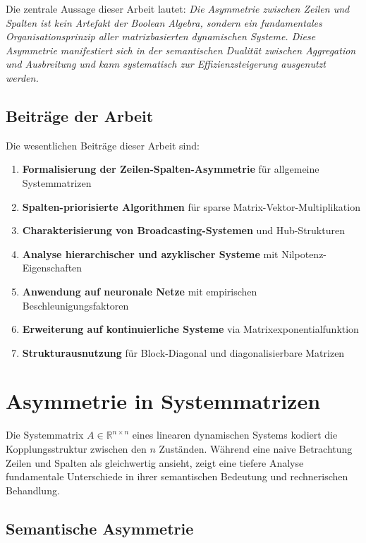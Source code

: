 ﻿\documentclass[a4paper,12pt]{report}
\theoremstyle{definition}
\begin{document}
	Die zentrale Aussage dieser Arbeit lautet: \textit{Die Asymmetrie zwischen Zeilen und Spalten ist kein Artefakt der Boolean Algebra, sondern ein fundamentales Organisationsprinzip aller matrixbasierten dynamischen Systeme. Diese Asymmetrie manifestiert sich in der semantischen Dualität zwischen Aggregation und Ausbreitung und kann systematisch zur Effizienzsteigerung ausgenutzt werden.}
	
	\section{Beiträge der Arbeit}
	
	Die wesentlichen Beiträge dieser Arbeit sind:
	
	\begin{enumerate}
		\item \textbf{Formalisierung der Zeilen-Spalten-Asymmetrie} für allgemeine Systemmatrizen
		\item \textbf{Spalten-priorisierte Algorithmen} für sparse Matrix-Vektor-Multiplikation
		\item \textbf{Charakterisierung von Broadcasting-Systemen} und Hub-Strukturen
		\item \textbf{Analyse hierarchischer und azyklischer Systeme} mit Nilpotenz-Eigenschaften
		\item \textbf{Anwendung auf neuronale Netze} mit empirischen Beschleunigungsfaktoren
		\item \textbf{Erweiterung auf kontinuierliche Systeme} via Matrixexponentialfunktion
		\item \textbf{Strukturausnutzung} für Block-Diagonal und diagonalisierbare Matrizen
	\end{enumerate}
	
	\chapter{Asymmetrie in Systemmatrizen}
	
	Die Systemmatrix $A \in \mathbb{R}^{n \times n}$ eines linearen dynamischen Systems kodiert die Kopplungsstruktur zwischen den $n$ Zuständen. Während eine naive Betrachtung Zeilen und Spalten als gleichwertig ansieht, zeigt eine tiefere Analyse fundamentale Unterschiede in ihrer semantischen Bedeutung und rechnerischen Behandlung.
	
	\section{Semantische Asymmetrie}
	
\end{document}
